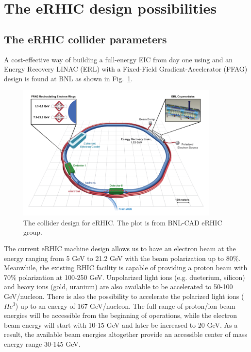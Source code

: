 \section{The eRHIC design possibilities}

\subsection{The eRHIC collider parameters}
A cost-effective way of building a full-energy EIC from day one using and an
Energy Recovery LINAC (ERL) with a Fixed-Field Gradient-Accelerator (FFAG)
design is found at BNL as shown in Fig.~\ref{fig:collider_eRHIC}.
\begin{figure}
\centering
\includegraphics[width=0.9\textwidth]{plots/chpt4/collider_eRHIC.png}
\caption[eRHIC collider design]{
The collider design for eRHIC. The plot is from BNL-CAD eRHIC group.}
\label{fig:collider_eRHIC}
\end{figure}
The current eRHIC machine design allows us to have an electron beam at the
energy ranging from 5 GeV to 21.2 GeV with the beam polarization up to 80\%.
Meanwhile, the existing RHIC facility is capable of providing a proton beam with
70\% polarization at 100-250 GeV. Unpolarized light ions (e.g. dueterium,
silicon) and heavy ions (gold, uranium) are also available to be accelerated to
50-100 GeV/nucleon. There is also the possibility to accelerate the polarized
light ions ($He^{3}$) up to an energy of 167 GeV/nucleon. The full range of
proton/ion beam energies will be accessible from the beginning of operations,
while the electron beam energy will start with 10-15 GeV and later be increased
to 20 GeV. As a result, the available beam energies altogether provide an
accessible center of mass energy range 30-145 GeV.



